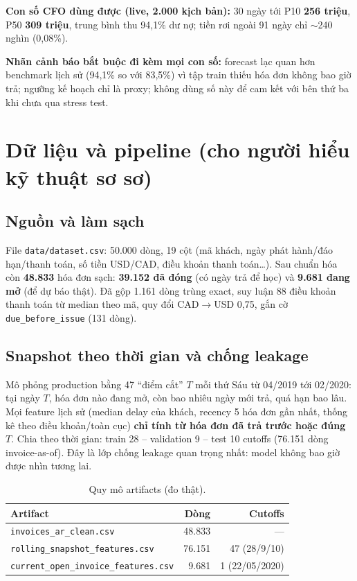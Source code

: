 \documentclass[12pt,a4paper]{article}
\begin{document}
\textbf{Con số CFO dùng được (live, 2.000 kịch bản):}
30 ngày tới P10 \textbf{256 triệu}, P50 \textbf{309 triệu}, trung bình thu 94,1\% dư nợ;
tiền rơi ngoài 91 ngày chỉ $\sim$240 nghìn (0,08\%).

\textbf{Nhãn cảnh báo bắt buộc đi kèm mọi con số:} forecast lạc quan hơn benchmark lịch sử
(94,1\% so với 83,5\%) vì tập train thiếu hóa đơn không bao giờ trả; ngưỡng kế hoạch chỉ là proxy;
không dùng số này để cam kết với bên thứ ba khi chưa qua stress test.

\section{Dữ liệu và pipeline (cho người hiểu kỹ thuật sơ sơ)}
\label{sec:data}

\subsection{Nguồn và làm sạch}
File \texttt{data/dataset.csv}: 50.000 dòng, 19 cột (mã khách, ngày phát hành/đáo hạn/thanh toán,
số tiền USD/CAD, điều khoản thanh toán\dots).
Sau chuẩn hóa còn \textbf{48.833} hóa đơn sạch: \textbf{39.152 đã đóng} (có ngày trả để học)
và \textbf{9.681 đang mở} (để dự báo thật). Đã gộp 1.161 dòng trùng exact, suy luận 88 điều khoản
thanh toán từ median theo mã, quy đổi CAD$\to$USD 0,75, gắn cờ \texttt{due\_before\_issue} (131 dòng).

\subsection{Snapshot theo thời gian và chống leakage}
Mô phỏng production bằng 47 ``điểm cắt'' $T$ mỗi thứ Sáu từ 04/2019 tới 02/2020:
tại ngày $T$, hóa đơn nào đang mở, còn bao nhiêu ngày mới trả, quá hạn bao lâu.
Mọi feature lịch sử (median delay của khách, recency 5 hóa đơn gần nhất, thống kê theo
điều khoản/toàn cục) \textbf{chỉ tính từ hóa đơn đã trả trước hoặc đúng $T$}.
Chia theo thời gian: train 28 -- validation 9 -- test 10 cutoffs (76.151 dòng invoice-as-of).
Đây là lớp chống leakage quan trọng nhất: model không bao giờ được nhìn tương lai.

\begin{table}[h]\centering
\caption{Quy mô artifacts (đo thật).}
\label{tab:scale-data}
\begin{tabular}{lrr}\toprule
Artifact & Dòng & Cutoffs \\\midrule
\texttt{invoices\_ar\_clean.csv} & 48.833 & --- \\
\texttt{rolling\_snapshot\_features.csv} & 76.151 & 47 (28/9/10) \\
\texttt{current\_open\_invoice\_features.csv} & 9.681 & 1 (22/05/2020) \\\bottomrule
\end{tabular}
\end{table}
\end{document}
